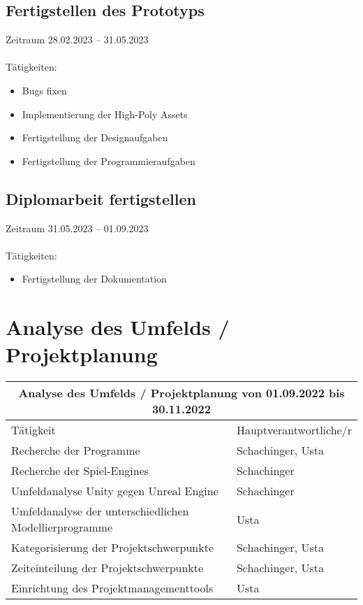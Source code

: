 \subsection{Fertigstellen des Prototyps}
Zeitraum 28.02.2023 – 31.05.2023\\\\
Tätigkeiten:
\begin{itemize}
    \item Bugs fixen
    \item Implementierung der High-Poly Assets
    \item Fertigstellung der Designaufgaben
    \item Fertigstellung der Programmieraufgaben
\end{itemize}

\subsection{Diplomarbeit fertigstellen}
Zeitraum 31.05.2023 – 01.09.2023\\\\
Tätigkeiten:
\begin{itemize}
    \item Fertigstellung der Dokumentation
\end{itemize}


\pagebreak

\section{Analyse des Umfelds / Projektplanung}
\begin{tabular}{|m{}|m{}|}
\hline
\multicolumn{2}{|c|}{\textbf{Analyse des Umfelds / Projektplanung von 01.09.2022 bis 30.11.2022}} \\
\hline
Tätigkeit & Hauptverantwortliche/r \\
\hline
Recherche der Programme & Schachinger, Usta \\
\hline
Recherche der Spiel-Engines & Schachinger \\
\hline
Umfeldanalyse Unity gegen Unreal Engine & Schachinger \\
\hline
Umfeldanalyse der unterschiedlichen Modellierprogramme & Usta \\
\hline
Kategorisierung der Projektschwerpunkte & Schachinger, Usta \\
\hline
Zeiteinteilung der Projektschwerpunkte & Schachinger, Usta \\
\hline
Einrichtung des Projektmanagementtools & Usta \\
\hline
\end{tabular}

